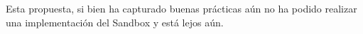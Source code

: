     Esta propuesta, si bien ha capturado buenas prácticas aún no ha podido realizar una implementación del Sandbox y está lejos aún.



%     
%     







